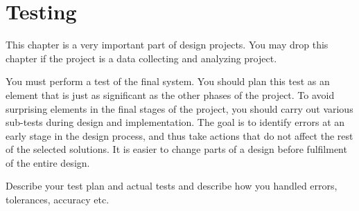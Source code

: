 \section{Testing}
This chapter is a very important part of design projects. You may drop this chapter if the project is a data collecting and analyzing project.

You must perform a test of the final system. You should plan this test as an element that is just as significant as the other phases of the project. To avoid surprising elements in the final stages of the project, you should carry out various sub-tests during design and implementation. The goal is to identify errors at an early stage in the design process, and thus take actions that do not affect the rest of the selected solutions. It is easier to change parts of a design before fulfilment of the entire design.

Describe your test plan and actual tests and describe how you handled errors, tolerances, accuracy etc.

\pagebreak